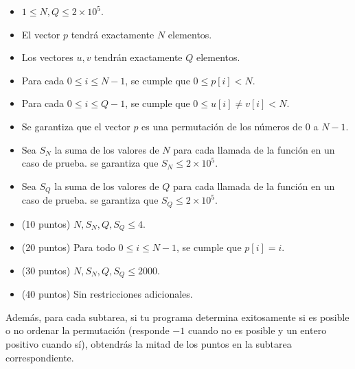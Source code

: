 \documentclass[12pt]{scrartcl}
\begin{document}
        \begin{itemize}
            \item $1 \le N, Q \le 2\times10^5$.
            \item El vector $p$ tendrá exactamente $N$ elementos.
            \item Los vectores $u, v$ tendrán exactamente $Q$ elementos.
            \item Para cada $0 \le i \le N - 1$, se cumple que $0 \le p[i] < N$. 
            \item Para cada $0 \le i \le Q - 1$, se cumple que $0 \le u[i] \neq v[i] < N$.
            \item Se garantiza que el vector $p$ es una permutación de los números de $0$ a $N - 1$.
            \item Sea $S_N$ la suma de los valores de $N$ para cada llamada de la función en un caso de prueba. se garantiza que $S_N \le 2 \times 10^5$.
            \item Sea $S_Q$ la suma de los valores de $Q$ para cada llamada de la función en un caso de prueba. se garantiza que $S_Q \le 2 \times 10^5$.
        \end{itemize}
    

    \begin{itemize}
        \item (10 puntos) $N, S_N, Q, S_Q \le 4$.
        \item (20 puntos) Para todo $0 \le i \le N - 1$, se cumple que $p[i] = i$.
        \item (30 puntos) $N, S_N, Q, S_Q \le 2000$.
        \item (40 puntos) Sin restricciones adicionales.
    \end{itemize}
    Además, para cada subtarea, si tu programa determina exitosamente si es posible o no ordenar la permutación (responde $-1$ cuando no es posible y un entero positivo cuando sí), obtendrás la mitad de los puntos en la subtarea correspondiente. 
\end{document}
